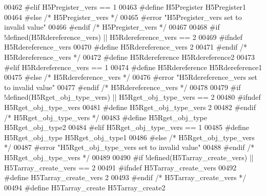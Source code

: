 \begin{DoxyCode}
00462 \textcolor{preprocessor}{#elif H5Pregister\_vers == 1}
00463 \textcolor{preprocessor}{  #define H5Pregister H5Pregister1}
00464 \textcolor{preprocessor}{#else }\textcolor{comment}{/* H5Pregister\_vers */}\textcolor{preprocessor}{}
00465 \textcolor{preprocessor}{  #error "H5Pregister\_vers set to invalid value"}
00466 \textcolor{preprocessor}{#endif }\textcolor{comment}{/* H5Pregister\_vers */}\textcolor{preprocessor}{}
00467 
00468 \textcolor{preprocessor}{#if !defined(H5Rdereference\_vers) || H5Rdereference\_vers == 2}
00469 \textcolor{preprocessor}{  #ifndef H5Rdereference\_vers}
00470 \textcolor{preprocessor}{    #define H5Rdereference\_vers 2}
00471 \textcolor{preprocessor}{  #endif }\textcolor{comment}{/* H5Rdereference\_vers */}\textcolor{preprocessor}{}
00472 \textcolor{preprocessor}{  #define H5Rdereference H5Rdereference2}
00473 \textcolor{preprocessor}{#elif H5Rdereference\_vers == 1}
00474 \textcolor{preprocessor}{  #define H5Rdereference H5Rdereference1}
00475 \textcolor{preprocessor}{#else }\textcolor{comment}{/* H5Rdereference\_vers */}\textcolor{preprocessor}{}
00476 \textcolor{preprocessor}{  #error "H5Rdereference\_vers set to invalid value"}
00477 \textcolor{preprocessor}{#endif }\textcolor{comment}{/* H5Rdereference\_vers */}\textcolor{preprocessor}{}
00478 
00479 \textcolor{preprocessor}{#if !defined(H5Rget\_obj\_type\_vers) || H5Rget\_obj\_type\_vers == 2}
00480 \textcolor{preprocessor}{  #ifndef H5Rget\_obj\_type\_vers}
00481 \textcolor{preprocessor}{    #define H5Rget\_obj\_type\_vers 2}
00482 \textcolor{preprocessor}{  #endif }\textcolor{comment}{/* H5Rget\_obj\_type\_vers */}\textcolor{preprocessor}{}
00483 \textcolor{preprocessor}{  #define H5Rget\_obj\_type H5Rget\_obj\_type2}
00484 \textcolor{preprocessor}{#elif H5Rget\_obj\_type\_vers == 1}
00485 \textcolor{preprocessor}{  #define H5Rget\_obj\_type H5Rget\_obj\_type1}
00486 \textcolor{preprocessor}{#else }\textcolor{comment}{/* H5Rget\_obj\_type\_vers */}\textcolor{preprocessor}{}
00487 \textcolor{preprocessor}{  #error "H5Rget\_obj\_type\_vers set to invalid value"}
00488 \textcolor{preprocessor}{#endif }\textcolor{comment}{/* H5Rget\_obj\_type\_vers */}\textcolor{preprocessor}{}
00489 
00490 \textcolor{preprocessor}{#if !defined(H5Tarray\_create\_vers) || H5Tarray\_create\_vers == 2}
00491 \textcolor{preprocessor}{  #ifndef H5Tarray\_create\_vers}
00492 \textcolor{preprocessor}{    #define H5Tarray\_create\_vers 2}
00493 \textcolor{preprocessor}{  #endif }\textcolor{comment}{/* H5Tarray\_create\_vers */}\textcolor{preprocessor}{}
00494 \textcolor{preprocessor}{  #define H5Tarray\_create H5Tarray\_create2}

\end{DoxyCode}
